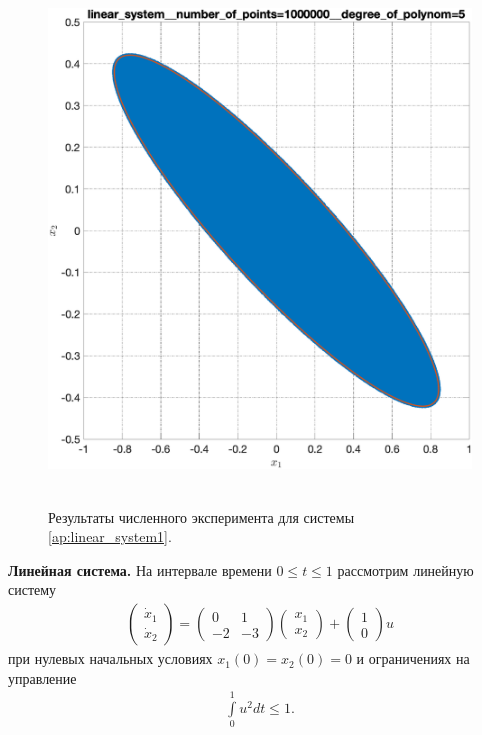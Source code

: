 \documentclass[../main.tex]{subfiles}
\begin{document}
\begin{figure}[ht!]
\begin{minipage}[b]{.4\linewidth}
  	\end{minipage}
  	\hfill
  	\begin{minipage}[b]{.4\linewidth} 
  		\small
  		\centering
  		\includegraphics[width=\linewidth]{images/linear_system__number_of_points=1000000__degree_of_polynom=5.eps}
  	\end{minipage} 
  	\caption{Результаты численного эксперимента для системы \eqref{ap:linear_system1}.}\label{fig:ap:rs_linear1}
  \end{figure}
  \textbf{Линейная система.} На интервале времени $ 0 \leqslant t \leqslant 1$ рассмотрим линейную систему 
  \begin{gather}\label{ap:linear_system1}
  	\begin{pmatrix} 
  		\dot{x}_1 \\
  		\dot{x}_2  
  	\end{pmatrix} = 
  	\begin{pmatrix}
  		0 & 1 \\
  		-2 & -3
  	\end{pmatrix}
  	\begin{pmatrix} 
  		x_1 \\
  		x_2  
  	\end{pmatrix} +
  	\begin{pmatrix} 1 \\ 0
  	\end{pmatrix} u
  \end{gather}
  при нулевых начальных условиях $x_1(0) = x_2(0) = 0 $ и ограничениях на управление 
  \begin{gather*}
  	\int\limits_0^1 u^2dt \leqslant 1.
  \end{gather*}
  
\end{document}
